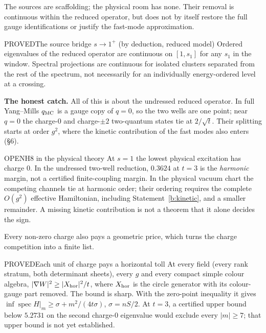 The sources are scaffolding; the physical room has none. Their removal is continuous within the reduced operator,
but does not by itself restore the full gauge identifications or justify the fast-mode approximation.

\begin{claim}{PROVED}{The source bridge $s\to1^+$ (by deduction, reduced model)}\label{b:bridge}
Ordered eigenvalues of the reduced operator are continuous on $[1,s_1]$ for any $s_1$ in the window.
Spectral projections are continuous for isolated clusters separated from the rest of the spectrum, not necessarily for
an individually energy-ordered level at a crossing.
\end{claim}

\textbf{The honest catch.} All of this is about the undressed reduced operator. In full Yang--Mills $q_{\rm MC}$ is a
gauge copy of $q=0$, so the two wells are one point; near $q=0$ the charge-0 and charge-$\pm2$ two-quantum states tie at
$2/\sqrt t$. Their splitting starts at order $g^2$, where the kinetic contribution of the fast modes also enters (\S6).

\begin{claim}{OPEN}{H8 in the physical theory}\label{b:h8}
At $s=1$ the lowest physical excitation has charge 0. In the undressed two-well reduction, $0.3624$ at $t=3$ is the
\emph{harmonic} margin, not a certified finite-coupling margin. In the physical vacuum chart the competing channels tie
at harmonic order; their ordering requires the complete $O(g^2)$ effective Hamiltonian, including Statement~\ref{b:kinetic},
and a smaller remainder. A missing kinetic contribution is not a theorem that it alone decides the sign.
\end{claim}

Every non-zero charge also pays a geometric price, which turns the charge competition into a finite list.

\begin{claim}{PROVED}{Each unit of charge pays a horizontal toll}\label{b:chargetail}
At every field (every rank stratum, both determinant sheets), every $g$ and every compact simple colour algebra,
$|\nabla W|^2\ge|X_{\rm hor}|^2/t$, where $X_{\rm hor}$ is the circle generator with its colour-gauge part removed.
The bound is sharp. With the zero-point inequality it gives $\inf\operatorname{spec}H|_m\ge\sigma+m^2/(4t\sigma)$,
$\sigma=nS/2$. At $t=3$, a certified upper bound below $5.2731$ on the second charge-0 eigenvalue would exclude
every $|m|\ge7$; that upper bound is not yet established.
\end{claim}

